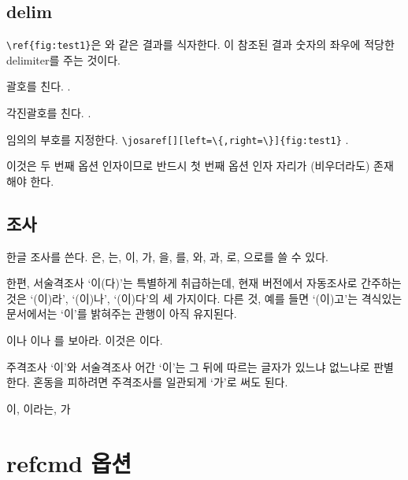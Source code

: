 \documentclass[polyglossia,a4paper,12pt,kosection]{oblivoir}
\begin{document}
\subsection{delim}

\verb|\ref{fig:test1}|은 와 같은 결과를 식자한다.
이 참조된 결과 숫자의 좌우에 적당한 delimiter를 주는 것이다.
\begin{description}\tightlist
\item [paren] 괄호를 친다. .
\item [bracket] 각진괄호를 친다. .
\item [left=, right= ] 임의의 부호를 지정한다. \verb|\josaref[][left=\{,right=\}]{fig:test1}| .
\end{description}

이것은 두 번째 옵션 인자이므로 반드시 첫 번째 옵션 인자 자리가 (비우더라도) 존재해야 한다.

\subsection{조사}

한글 조사를 쓴다. 은, 는, 이, 가, 을, 를, 와, 과, 로, 으로를 쓸 수 있다.

한편, 서술격조사 `이(다)'는 특별하게 취급하는데, 현재 버전에서 자동조사로 간주하는 것은 `(이)라', `(이)나', `(이)다'의 세 가지이다. 다른 것, 예를 들면 `(이)고'는 격식있는 문서에서는 `이'를 밝혀주는 관행이 아직 유지된다.

\medskip

\begin{coderesult}
이나 이나 를 보아라.
이것은 이다.
\end{coderesult}

주격조사 `이'와 서술격조사 어간 `이'는 그 뒤에 따르는 글자가 있느냐 없느냐로 판별한다.
혼동을 피하려면 주격조사를 일관되게 `가'로 써도 된다.

\medskip

\begin{coderesult}
이, 이라는, 가
\end{coderesult}

\section{refcmd 옵션}
\end{document}

